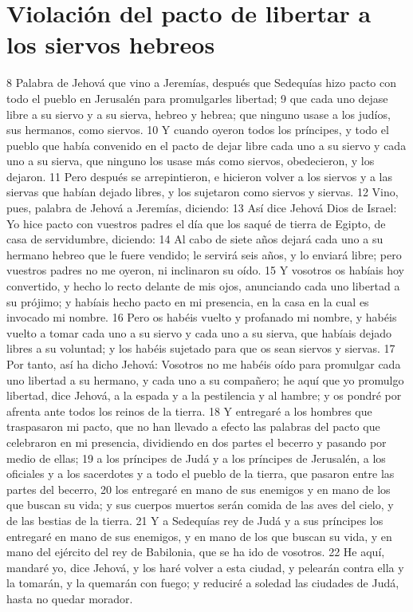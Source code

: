 \section*{Violación del pacto de libertar a los siervos hebreos}

8 Palabra de Jehová que vino a Jeremías, después que Sedequías hizo pacto con todo el pueblo en Jerusalén para promulgarles libertad;
9 que cada uno dejase libre a su siervo y a su sierva, hebreo y hebrea; que ninguno usase a los judíos, sus hermanos, como siervos.
10 Y cuando oyeron todos los príncipes, y todo el pueblo que había convenido en el pacto de dejar libre cada uno a su siervo y cada uno a su sierva, que ninguno los usase más como siervos, obedecieron, y los dejaron.
11 Pero después se arrepintieron, e hicieron volver a los siervos y a las siervas que habían dejado libres, y los sujetaron como siervos y siervas.
12 Vino, pues, palabra de Jehová a Jeremías, diciendo:
13 Así dice Jehová Dios de Israel: Yo hice pacto con vuestros padres el día que los saqué de tierra de Egipto, de casa de servidumbre, diciendo:
14 Al cabo de siete años dejará cada uno a su hermano hebreo que le fuere vendido; le servirá seis años, y lo enviará libre; pero vuestros padres no me oyeron, ni inclinaron su oído.
15 Y vosotros os habíais hoy convertido, y hecho lo recto delante de mis ojos, anunciando cada uno libertad a su prójimo; y habíais hecho pacto en mi presencia, en la casa en la cual es invocado mi nombre.
16 Pero os habéis vuelto y profanado mi nombre, y habéis vuelto a tomar cada uno a su siervo y cada uno a su sierva, que habíais dejado libres a su voluntad; y los habéis sujetado para que os sean siervos y siervas.
17 Por tanto, así ha dicho Jehová: Vosotros no me habéis oído para promulgar cada uno libertad a su hermano, y cada uno a su compañero; he aquí que yo promulgo libertad, dice Jehová, a la espada y a la pestilencia y al hambre; y os pondré por afrenta ante todos los reinos de la tierra.
18 Y entregaré a los hombres que traspasaron mi pacto, que no han llevado a efecto las palabras del pacto que celebraron en mi presencia, dividiendo en dos partes el becerro y pasando por medio de ellas;
19 a los príncipes de Judá y a los príncipes de Jerusalén, a los oficiales y a los sacerdotes y a todo el pueblo de la tierra, que pasaron entre las partes del becerro,
20 los entregaré en mano de sus enemigos y en mano de los que buscan su vida; y sus cuerpos muertos serán comida de las aves del cielo, y de las bestias de la tierra.
21 Y a Sedequías rey de Judá y a sus príncipes los entregaré en mano de sus enemigos, y en mano de los que buscan su vida, y en mano del ejército del rey de Babilonia, que se ha ido de vosotros.
22 He aquí, mandaré yo, dice Jehová, y los haré volver a esta ciudad, y pelearán contra ella y la tomarán, y la quemarán con fuego; y reduciré a soledad las ciudades de Judá, hasta no quedar morador.


